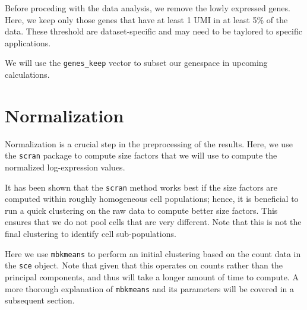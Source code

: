 \documentclass[]{book}
\newenvironment{Shaded}{\begin{snugshade}}{\end{snugshade}}
\newcommand{\DecValTok}[1]{\textcolor[rgb]{0.00,0.00,0.81}{#1}}
\newcommand{\FloatTok}[1]{\textcolor[rgb]{0.00,0.00,0.81}{#1}}
\newcommand{\KeywordTok}[1]{\textcolor[rgb]{0.13,0.29,0.53}{\textbf{#1}}}
\newcommand{\NormalTok}[1]{#1}
\newcommand{\OperatorTok}[1]{\textcolor[rgb]{0.81,0.36,0.00}{\textbf{#1}}}
\newcommand{\StringTok}[1]{\textcolor[rgb]{0.31,0.60,0.02}{#1}}
\begin{document}
Before proceding with the data analysis, we remove the lowly expressed genes. Here, we keep only those genes that have at least 1 UMI in at least 5\% of the data. These threshold are dataset-specific and may need to be taylored to specific applications.

\begin{Shaded}
\end{Shaded}

We will use the \texttt{genes\_keep} vector to subset our genespace in upcoming calculations.

\hypertarget{normalization}{%
\section{Normalization}\label{normalization}}

Normalization is a crucial step in the preprocessing of the results. Here, we use the \texttt{scran} package to compute size factors that we will use to compute the normalized log-expression values.

It has been shown that the \texttt{scran} method works best if the size factors are computed within roughly homogeneous cell populations; hence, it is beneficial to run a quick clustering on the raw data to compute better size factors. This ensures that we do not pool cells that are very different. Note that this is not the final clustering to identify cell sub-populations.

Here we use \texttt{mbkmeans} to perform an initial clustering based on the count data in the \texttt{sce} object. Note that given that this operates on counts rather than the principal components, and thus will take a longer amount of time to compute. A more thorough explanation of \texttt{mbkmeans} and its parameters will be covered in a subsequent section.
\end{document}
